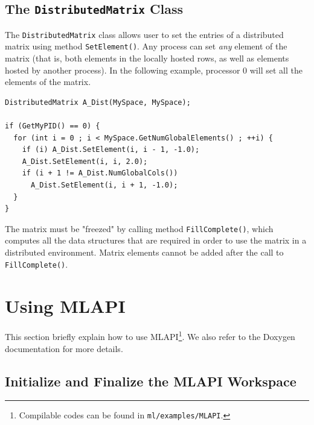 \documentclass{article}[11pt]
\newcommand{\MLAPI}  {{\sc MLAPI }}
\newcommand{\MLAPIns}  {{\sc MLAPI}}
\begin{document}
\subsection{The {\tt DistributedMatrix} Class}
\label{sec:distributedmatrix}

The {\tt DistributedMatrix} class allows user to set the entries of a
distributed matrix using method {\tt SetElement()}. Any process can set {\sl
  any} element of the matrix (that is, both elements in the locally hosted
rows, as well as elements hosted by another process). In the following
  example, processor 0 will set all the elements of the matrix.
\begin{verbatim}
DistributedMatrix A_Dist(MySpace, MySpace);

if (GetMyPID() == 0) {
  for (int i = 0 ; i < MySpace.GetNumGlobalElements() ; ++i) {
    if (i) A_Dist.SetElement(i, i - 1, -1.0);
    A_Dist.SetElement(i, i, 2.0);
    if (i + 1 != A_Dist.NumGlobalCols())
      A_Dist.SetElement(i, i + 1, -1.0);
  }
}
\end{verbatim}
The matrix must be "freezed" by calling method {\tt FillComplete()}, which
computes all the data structures that are required in order to use the matrix
in a distributed environment. Matrix elements cannot be added after the call
to {\tt FillComplete()}.

\section{Using \MLAPI}
\label{sec:usage}

This section briefly explain how to use \MLAPIns\footnote{Compilable codes
can be found in {\tt ml/examples/MLAPI}.}. We also refer to the Doxygen
documentation for more details.

\subsection{Initialize and Finalize the \MLAPI Workspace}
\label{sec:workspace}
\end{document}
